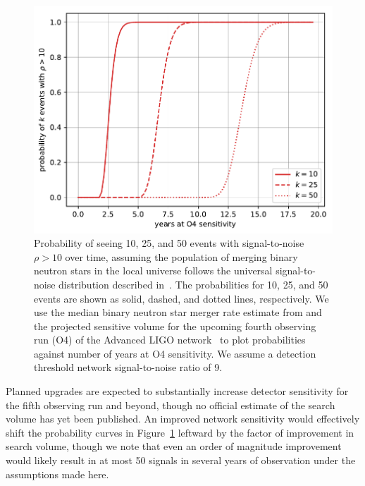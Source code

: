 \begin{figure}[ht]
\includegraphics[width=\textwidth]{Figures/eos-meas/probability_over_time_snr10.pdf}
\caption{Probability of seeing 10, 25, and 50 events with signal-to-noise $\rho>10$ over time, assuming the population of merging binary neutron stars in the local universe follows the universal signal-to-noise distribution described in~\cite{Chen:2014yla}. The probabilities for 10, 25, and 50 events are shown as solid, dashed, and dotted lines, respectively. We use the median binary neutron star merger rate estimate from \cite{Abbott:2020gyp} and the projected sensitive volume for the upcoming fourth observing run (O4) of the Advanced LIGO network~\cite{Aasi:2013wya} to plot probabilities against number of years at O4 sensitivity. We assume a detection threshold network signal-to-noise ratio of 9.}
\label{fig:prob_of_events}
\end{figure}

Planned upgrades are expected to substantially increase detector sensitivity for the fifth observing run and beyond, though no official estimate of the search volume has yet been published. An improved network sensitivity would effectively shift the probability curves in Figure~\ref{fig:prob_of_events} leftward by the factor of improvement in search volume, though we note that even an order of magnitude improvement would likely result in at most 50 signals in several years of observation under the assumptions made here.

